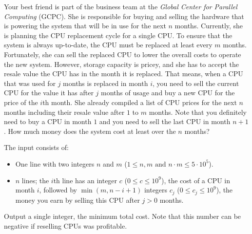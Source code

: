 
Your best friend is part of the business team at the \emph{Global Center for Parallel Computing} (GCPC).
She is responsible for buying and selling the hardware that is powering the system that will be in use for the next \(n\) months.
%
Currently, she is planning the CPU replacement cycle for a single CPU.
To ensure that the system is always up-to-date, the CPU must be replaced at least every \(m\) months.
%
Fortunately, she can sell the replaced CPU to lower the overall costs to operate the new system.
However, storage capacity is pricey, and she has to accept the resale value the CPU has in the month it is replaced.
That means, when a CPU that was used for \(j\) months is replaced in month \(i\), you need to sell the current CPU for the value it has after \(j\) months of usage and buy a new CPU for the price of the \(i\)th month.
%
She already compiled a list of CPU prices for the next \(n\) months including their resale value after \(1\) to \(m\) months.
%
Note that you definitely need to buy a CPU in month \(1\) and you need to sell the last CPU in month \(n + 1\).
How much money does the system cost at least over the \(n\) months?

\begin{Input}
  The input consists of:
  \begin{itemize}
	  \item One line with two integers \(n\) and \(m\) (\(1\leq n,m\text{ and } n \cdot m \leq 5 \cdot 10^5\)).
	  \item \(n\) lines; the $i$th line has an integer $c$ (\(0 \leq c \leq 10^9\)), the cost of a CPU in month \(i\), followed by \(\min(m, n - i + 1)\) integers $c_j$ (\(0 \leq c_j \leq 10^9\)), the money you earn by selling this CPU after $j > 0$ months.
  \end{itemize}
\end{Input}

\begin{Output}
  Output a single integer, the minimum total cost.
  Note that this number can be negative if reselling CPUs was profitable.
\end{Output}
